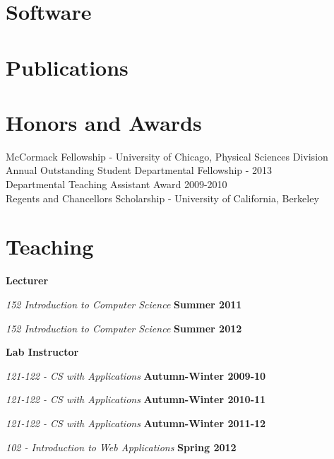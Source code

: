 \documentclass[margin,line]{res}
\newenvironment{list1}{
  \begin{list}{\ding{113}}{%
      \setlength{\itemsep}{0in}
      \setlength{\parsep}{0in} \setlength{\parskip}{0in}
      \setlength{\topsep}{0in} \setlength{\partopsep}{0in} 
      \setlength{\leftmargin}{0.17in}}}{\end{list}}
\begin{document}
\begin{resume}
\section{\sc Software}



\section{\sc Publications}





\section{\sc Honors and Awards} 

McCormack Fellowship - University of Chicago, Physical Sciences Division\\
Annual Outstanding Student Departmental Fellowship - 2013\\
Departmental Teaching Assistant Award 2009-2010\\
Regents and Chancellors Scholarship - University of California, Berkeley\\

\section {\sc Teaching}

{\bf Lecturer}
\begin{list1}
\item[] {\em 152 Introduction to Computer Science} \hfill {\bf Summer 2011}
\item[] {\em 152 Introduction to Computer Science} \hfill {\bf Summer 2012}
\end{list1}

{\bf Lab Instructor}
\begin{list1}
\item[] {\em 121-122 - CS with Applications}  \hfill {\bf Autumn-Winter 2009-10}
\item[] {\em 121-122 - CS with Applications}  \hfill {\bf Autumn-Winter 2010-11}
\item[] {\em 121-122 - CS with Applications}  \hfill {\bf Autumn-Winter 2011-12}
\item[] {\em 102 - Introduction to Web Applications}  \hfill {\bf Spring 2012}
\end{list1}


\end{resume}
\end{document}

